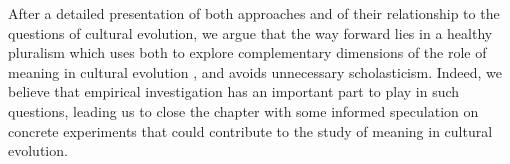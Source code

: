 \documentclass[english,]{article}
\begin{document}
After a detailed presentation of both approaches and of their relationship to the questions of cultural evolution, we argue that the way forward lies in a healthy pluralism which uses both to explore complementary dimensions of the role of meaning in cultural evolution \autocite[in accordance with][]{chemero_after_2008}, and avoids unnecessary scholasticism.
Indeed, we believe that empirical investigation has an important part to play in such questions, leading us to close the chapter with some informed speculation on concrete experiments that could contribute to the study of meaning in cultural evolution.







\end{document}
